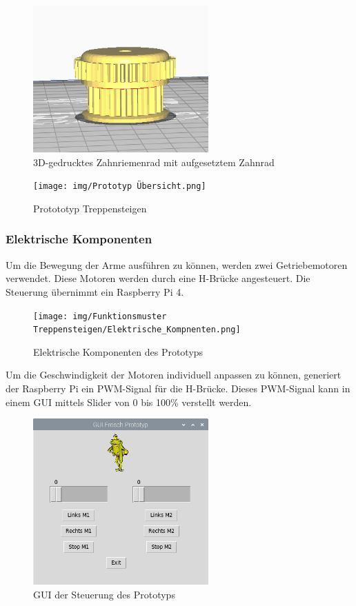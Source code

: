 \begin{figure}[H]
  \includegraphics[width=0.6\textwidth]{img/Zahnrad gedruckt.JPG}
  \centering
  \caption{3D-gedrucktes Zahnriemenrad mit aufgesetztem Zahnrad}
\end{figure}

\begin{figure}[H]
  \texttt{[image: img/Prototyp Übersicht.png]}
  \centering
  \caption{Protototyp Treppensteigen}
\end{figure}

\subsubsection{Elektrische Komponenten}
Um die Bewegung der Arme ausführen zu können, werden zwei Getriebemotoren verwendet. Diese Motoren werden durch eine H-Brücke angesteuert. Die Steuerung übernimmt ein Raspberry Pi 4.

\begin{figure}[H]
  \texttt{[image: img/Funktionsmuster Treppensteigen/Elektrische\_Kompnenten.png]}
  \centering
  \caption{Elektrische Komponenten des Prototyps}
\end{figure}

\newpage

Um die Geschwindigkeit der Motoren individuell anpassen zu können, generiert der Raspberry Pi ein PWM-Signal für die H-Brücke. Dieses PWM-Signal kann in einem GUI mittels Slider von 0 bis 100\% verstellt werden. 

\begin{figure}[H]
  \includegraphics[width=0.6\textwidth]{img/Funktionsmuster Treppensteigen/GUI_Prototyp.png}
  \centering
  \caption{GUI der Steuerung des Prototyps}
\end{figure}

